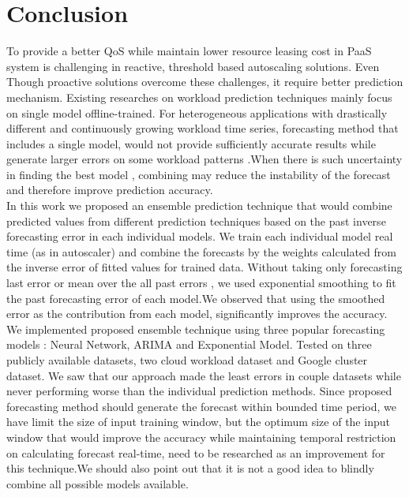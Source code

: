 \section{Conclusion}

To provide a better QoS while maintain lower resource leasing cost in PaaS system is challenging in reactive, threshold based autoscaling solutions. Even Though  proactive solutions overcome these challenges, it require better prediction mechanism. Existing researches on  workload prediction techniques mainly focus on single model offline-trained. For heterogeneous  applications with drastically different  and continuously growing workload time series, forecasting method that includes a single model, would not provide sufficiently accurate results while generate larger errors on some workload patterns .When there is such uncertainty in finding the best model , combining may reduce the instability of the forecast and therefore improve prediction accuracy.  \\

In this work we proposed an ensemble prediction technique that would combine predicted values from different prediction techniques based on the past inverse forecasting error in each individual models. We train each individual model real time (as in autoscaler) and combine the forecasts by the weights calculated from the inverse error of fitted values for trained data. Without taking only forecasting last error or mean over the all past errors , we used exponential smoothing to fit the past forecasting error of each model.We observed that using the smoothed error as the contribution from each model, significantly improves the accuracy.  We implemented proposed ensemble technique using three popular forecasting models : Neural Network, ARIMA and Exponential Model. Tested on three publicly available datasets, two cloud workload dataset and Google cluster dataset.  We saw that our approach made the least errors in couple datasets while never performing worse than the individual prediction methods. Since proposed forecasting method should generate the forecast within bounded time period, we have limit the size of input training window, but the optimum size of the input window that would improve the accuracy while maintaining temporal restriction on calculating forecast real-time,  need to be researched as an improvement for this technique.We should also point out that it is not a good idea to blindly combine all possible models available.

